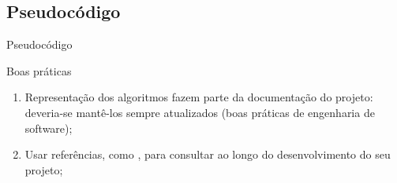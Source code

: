 \documentclass{beamer}
\begin{document}
\subsection{Pseudocódigo}
\begin{frame}[fragile]{Pseudocódigo}

    \SetAlgoNoLine
    \SetAlgoNoEnd
    \renewcommand{\thealgocf}{}

    \centering
\end{frame}

\begin{frame}{Boas práticas}
    \small

    \begin{enumerate}
        \item Representação dos algoritmos fazem parte da documentação do projeto: deveria-se mantê-los sempre atualizados (boas práticas de engenharia de software);
        \item Usar referências, como \cite{forbellone2005}, para consultar ao longo do desenvolvimento do seu projeto; 
    \end{enumerate}
\end{frame}



\end{document}
